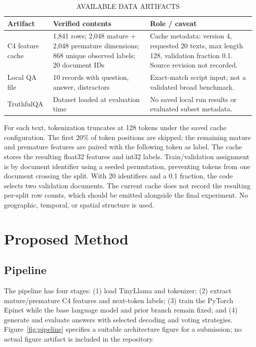 \documentclass[conference]{IEEEtran}
\begin{document}
\begin{table}[t]
\caption{AVAILABLE DATA ARTIFACTS}
\label{tab:data}
\centering\small
\begin{tabular}{p{}p{}p{}}
\toprule
Artifact & Verified contents & Role / caveat\\
\midrule
C4 feature cache & 1,841 rows; 2,048 mature + 2,048 premature dimensions; 868 unique observed labels; 20 document IDs & Cache metadata: version 4, requested 20 texts, max length 128, validation fraction 0.1. Source revision not recorded.\\
Local QA file & 10 records with question, answer, distractors & Exact-match script input; not a validated broad benchmark.\\
TruthfulQA & Dataset loaded at evaluation time & No saved local run results or evaluated subset metadata.\\
\bottomrule
\end{tabular}
\end{table}

For each text, tokenization truncates at 128 tokens under the saved cache configuration. The first 20\% of token positions are skipped; the remaining mature and premature features are paired with the following token as label. The cache stores the resulting float32 features and int32 labels. Train/validation assignment is by document identifier using a seeded permutation, preventing tokens from one document crossing the split. With 20 identifiers and a 0.1 fraction, the code selects two validation documents. The current cache does not record the resulting per-split row counts, which should be emitted alongside the final experiment. No geographic, temporal, or spatial structure is used.

\section{Proposed Method}
\subsection{Pipeline}
The pipeline has four stages: (1) load TinyLlama and tokenizer; (2) extract mature/premature C4 features and next-token labels; (3) train the PyTorch Epinet while the base language model and prior branch remain fixed; and (4) generate and evaluate answers with selected decoding and voting strategies. Figure~\ref{fig:pipeline} specifies a suitable architecture figure for a submission; no actual figure artifact is included in the repository.
\end{document}
